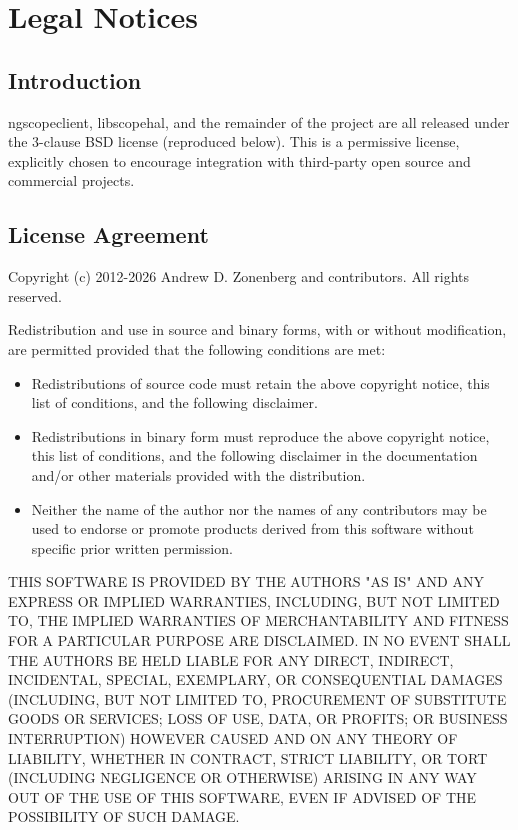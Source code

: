 \chapter{Legal Notices}

\section{Introduction}

ngscopeclient, libscopehal, and the remainder of the project are all released under the 3-clause BSD license
(reproduced below). This is a permissive license, explicitly chosen to encourage integration with third-party open
source and commercial projects.

\section{License Agreement}

Copyright (c) 2012-2026 Andrew D. Zonenberg and contributors.
All rights reserved.

Redistribution and use in source and binary forms, with or without modification, are permitted provided that the
following conditions are met:
\begin{itemize}
\item Redistributions of source code must retain the above copyright notice, this list of conditions, and the
following disclaimer.
\item Redistributions in binary form must reproduce the above copyright notice, this list of conditions, and the
following disclaimer in the documentation and/or other materials provided with the distribution.
\item Neither the name of the author nor the names of any contributors may be used to endorse or promote products
derived from this software without specific prior written permission.
\end{itemize}

THIS SOFTWARE IS PROVIDED BY THE AUTHORS "AS IS" AND ANY EXPRESS OR IMPLIED WARRANTIES, INCLUDING, BUT NOT LIMITED
TO, THE IMPLIED WARRANTIES OF MERCHANTABILITY AND FITNESS FOR A PARTICULAR PURPOSE ARE DISCLAIMED. IN NO EVENT SHALL
THE AUTHORS BE HELD LIABLE FOR ANY DIRECT, INDIRECT, INCIDENTAL, SPECIAL, EXEMPLARY, OR CONSEQUENTIAL DAMAGES
(INCLUDING, BUT NOT LIMITED TO, PROCUREMENT OF SUBSTITUTE GOODS OR SERVICES; LOSS OF USE, DATA, OR PROFITS; OR
BUSINESS INTERRUPTION) HOWEVER CAUSED AND ON ANY THEORY OF LIABILITY, WHETHER IN CONTRACT, STRICT LIABILITY, OR TORT
(INCLUDING NEGLIGENCE OR OTHERWISE) ARISING IN ANY WAY OUT OF THE USE OF THIS SOFTWARE, EVEN IF ADVISED OF THE
POSSIBILITY OF SUCH DAMAGE.

